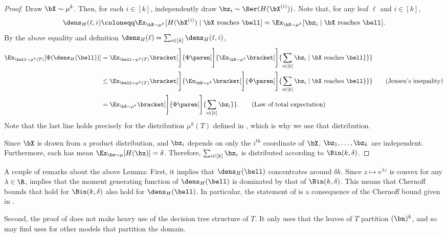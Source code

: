 \begin{proof}
    Draw $\bX \sim \mu^k$. Then, for each $i \in [k]$, independently draw $\bz_i \sim \Ber(H(\bX^{(i)}))$. Note that, for any leaf $\ell$ and $i \in [k]$,
    \begin{equation*}
        \dens_H(\ell, i) \coloneqq \Ex_{\bX \sim \mu^k}[H(\bX^{(i)}) \mid \bX\text{ reaches }\bell] = \Ex_{\bX \sim \mu^k}[\bz_i \mid \bX\text{ reaches }\bell].
    \end{equation*}
    By the above equality and definition $\dens_H(\ell) = \sum_{i \in [k]}\dens_H(\ell,i)$,
    \begin{align*}
        \Ex_{\bell \sim \mu^k(T)}[\Phi(\dens_H(\bell))] &= \Ex_{\bell \sim \mu^k(T)}\bracket[\Bigg]{\Phi\paren[\Bigg]{ \Ex_{\bX \sim \mu^k}\bracket[\Bigg]{\sum_{i \in [k]}\bz_i \mid \bX\text{ reaches }\bell}}}\\
        &\leq \Ex_{\bell \sim \mu^k(T)}\bracket[\Bigg]{\Ex_{\bX \sim \mu^k}\bracket[\Bigg]{\Phi\paren[\Bigg]{ \sum_{i \in [k]}\bz_i \mid \bX\text{ reaches }\bell}}} \tag{Jensen's inequality} \\
        &= \Ex_{\bX \sim \mu^k}\bracket[\Bigg]{\Phi\paren[\Bigg]{ \sum_{i \in [k]}\bz_i}}. \tag{Law of total expectation}
    \end{align*}
    Note that the last line holds precisely for the distribution $\mu^k(T)$ defined in , which is why we use that distribution.

    Since $\bX$ is drawn from a product distribution, and $\bz_i$ depends on only the $i^{\text{th}}$ coordinate of $\bX$, $\bz_1,\ldots, \bz_k$ are independent. Furthermore, each has mean $\Ex_{\bx \sim \mu}[H(\bx)] = \delta$. Therefore, $\sum_{i \in [k]}\bz_i$ is distributed according to $\Bin(k,\delta)$.
\end{proof}
A couple of remarks about the above Lemma: First, it implies that $\dens_H(\bell)$ concentrates around $\delta k$. Since $z \mapsto e^{\lambda z}$ is convex for any $\lambda \in \R$,   implies that the moment generating function of $\dens_H(\bell)$ is dominated by that of $\Bin(k,\delta)$. This means that Chernoff bounds that hold for $\Bin(k,\delta)$ also hold for $\dens_H(\bell)$. In particular, the statement of  is a consequence of the Chernoff bound given in .

Second, the proof of  does not make heavy use of the decision tree structure of $T$. It only uses that the leaves of $T$ partition $(\bn)^k$, and so may find uses for other models that partition the domain.


